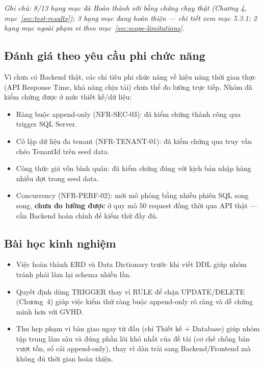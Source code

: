 \textit{Ghi chú: 8/13 hạng mục đã Hoàn thành với bằng chứng chạy thật (Chương 4, mục~\ref{sec:test-results}); 3 hạng mục đang hoàn thiện — chi tiết xem mục 5.3.1; 2 hạng mục ngoài phạm vi theo mục~\ref{sec:scope-limitations}.}
\subsection{Đánh giá theo yêu cầu phi chức năng}
Vì chưa có Backend thật, các chỉ tiêu phi chức năng về hiệu năng thời gian thực (API Response Time, khả năng chịu tải) chưa thể đo lường trực tiếp. Nhóm đã kiểm chứng được ở mức thiết kế/dữ liệu:
\begin{itemize}
    \item Ràng buộc append-only (NFR-SEC-03): đã kiểm chứng thành công qua trigger SQL Server.
    \item Cô lập dữ liệu đa tenant (NFR-TENANT-01): đã kiểm chứng qua truy vấn chéo TenantId trên seed data.
    \item Công thức giá vốn bình quân: đã kiểm chứng đúng với kịch bản nhập hàng nhiều đợt trong seed data.
    \item Concurrency (NFR-PERF-02): mới mô phỏng bằng nhiều phiên SQL song song, \textbf{chưa đo lường được} ở quy mô 50 request đồng thời qua API thật — cần Backend hoàn chỉnh để kiểm thử đầy đủ.
\end{itemize}

\subsection{Bài học kinh nghiệm}
\begin{itemize}
    \item Việc hoàn thành ERD và Data Dictionary trước khi viết DDL giúp nhóm tránh phải làm lại schema nhiều lần.
    \item Quyết định dùng TRIGGER thay vì RULE để chặn UPDATE/DELETE (Chương~4) giúp việc kiểm thử ràng buộc append-only rõ ràng và dễ chứng minh hơn với GVHD.
    \item Thu hẹp phạm vi bàn giao ngay từ đầu (chỉ Thiết kế + Database) giúp nhóm tập trung làm sâu và đúng phần lõi khó nhất của đề tài (cơ chế chống bán vượt tồn, sổ cái append-only), thay vì dàn trải sang Backend/Frontend mà không đủ thời gian hoàn thiện.
\end{itemize}
